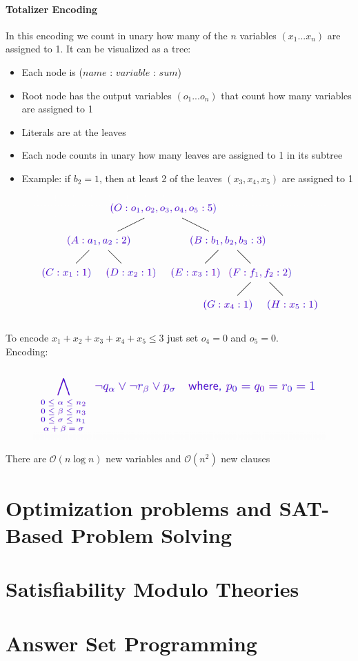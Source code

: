\documentclass[10pt,a4paper]{report}
\begin{document}
\subsubsection{Totalizer Encoding}
In this encoding we count in unary how many of the $n$ variables $(x_1 ... x_n)$ are assigned to 1. It can be visualized as a tree:
\begin{itemize}
    \item Each node is ($name$ : $variable$ : $sum$)
    \item Root node has the output variables $(o_1 ... o_n)$ that count how many variables are assigned to 1
    \item Literals are at the leaves
    \item Each node counts in unary how many leaves are assigned to 1 in its subtree
    \item Example: if $b_2 = 1$, then at least 2 of the leaves $(x_3, x_4, x_5)$ are
    assigned to 1
\end{itemize}
\begin{figure}[H]
    \centering
    \includegraphics[scale=0.5]{2.png}
\end{figure}
To encode $x_1 + x_2 + x_3 + x_4 + x_5 \leq 3$ just set $o_4=0$ and $o_5=0$.\\
Encoding:
\begin{figure}[H]
    \centering
    \includegraphics[scale=0.5]{3.png}
\end{figure}
There are $\mathcal{O}(n\log n)$ new variables and $\mathcal{O}(n^2)$ new clauses

\chapter{Optimization problems and SAT-Based Problem Solving}
\chapter{Satisfiability Modulo Theories}
\chapter{Answer Set Programming}
\end{document}

